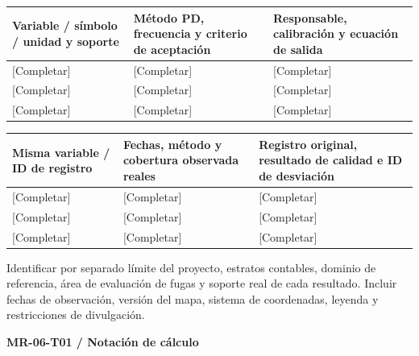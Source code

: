 {\sffamily\fontsize{8.6}{10.7}\selectfont\begin{longtable}{@{}P{48mm}P{61mm}P{53mm}@{}}
\toprule
\textbf{Variable / símbolo / unidad y soporte} & \textbf{Método PD, frecuencia y criterio de aceptación} & \textbf{Responsable, calibración y ecuación de salida}\\\midrule\endhead
\rule{0pt}{8mm}[Completar] & [Completar] & [Completar]\\\hline
\rule{0pt}{8mm}[Completar] & [Completar] & [Completar]\\\hline
\rule{0pt}{8mm}[Completar] & [Completar] & [Completar]\\\hline
\end{longtable}}
{\sffamily\fontsize{8.6}{10.7}\selectfont\begin{longtable}{@{}P{48mm}P{61mm}P{53mm}@{}}
\toprule
\textbf{Misma variable / ID de registro} & \textbf{Fechas, método y cobertura observada reales} & \textbf{Registro original, resultado de calidad e ID de desviación}\\\midrule\endhead
\rule{0pt}{8mm}[Completar] & [Completar] & [Completar]\\\hline
\rule{0pt}{8mm}[Completar] & [Completar] & [Completar]\\\hline
\rule{0pt}{8mm}[Completar] & [Completar] & [Completar]\\\hline
\end{longtable}}
Identificar por separado límite del proyecto, estratos contables, dominio de referencia, área de evaluación de fugas y soporte real de cada resultado. Incluir fechas de observación, versión del mapa, sistema de coordenadas, leyenda y restricciones de divulgación.\par
{}
\ProjectMapBox
{}
\par\begingroup\sffamily\fontsize{8.4}{10.5}\selectfont\color{NEBGreen}
\textbf{MR-06-T01 / Notación de cálculo}\
